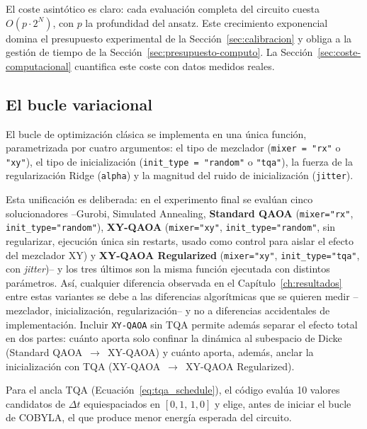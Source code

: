 El coste asintótico es claro: cada evaluación completa del circuito cuesta $O(p \cdot 2^N)$, con $p$ la profundidad del ansatz. Este crecimiento exponencial domina el presupuesto experimental de la Sección~\ref{sec:calibracion} y obliga a la gestión de tiempo de la Sección~\ref{sec:presupuesto-computo}. La Sección~\ref{sec:coste-computacional} cuantifica este coste con datos medidos reales.

\subsection{El bucle variacional}
\label{subsec:bucle-variacional}

El bucle de optimización clásica se implementa en una única función, parametrizada por cuatro argumentos: el tipo de mezclador (\texttt{mixer = "rx"} o \texttt{"xy"}), el tipo de inicialización (\texttt{init\_type = "random"} o \texttt{"tqa"}), la fuerza de la regularización Ridge (\texttt{alpha}) y la magnitud del ruido de inicialización (\texttt{jitter}).

Esta unificación es deliberada: en el experimento final se evalúan cinco solucionadores --Gurobi, Simulated Annealing, \textbf{Standard QAOA} (\texttt{mixer="rx"}, \texttt{init\_type="random"}), \textbf{XY-QAOA} (\texttt{mixer="xy"}, \texttt{init\_type="random"}, sin regularizar, ejecución única sin restarts, usado como control para aislar el efecto del mezclador XY) y \textbf{XY-QAOA Regularized} (\texttt{mixer="xy"}, \texttt{init\_type="tqa"}, con \textit{jitter})-- y los tres últimos son la misma función \texttt{} ejecutada con distintos parámetros. Así, cualquier diferencia observada en el Capítulo~\ref{ch:resultados} entre estas variantes se debe a las diferencias algorítmicas que se quieren medir --mezclador, inicialización, regularización-- y no a diferencias accidentales de implementación. Incluir \texttt{XY-QAOA} sin TQA permite además separar el efecto total en dos partes: cuánto aporta solo confinar la dinámica al subespacio de Dicke (Standard QAOA~$\rightarrow$~XY-QAOA) y cuánto aporta, además, anclar la inicialización con TQA (XY-QAOA~$\rightarrow$~XY-QAOA Regularized).

Para el ancla TQA (Ecuación~\eqref{eq:tqa_schedule}), el código evalúa 10 valores candidatos de $\Delta t$ equiespaciados en $[0{,}1,\, 1{,}0]$ y elige, antes de iniciar el bucle de COBYLA, el que produce menor energía esperada del circuito.

